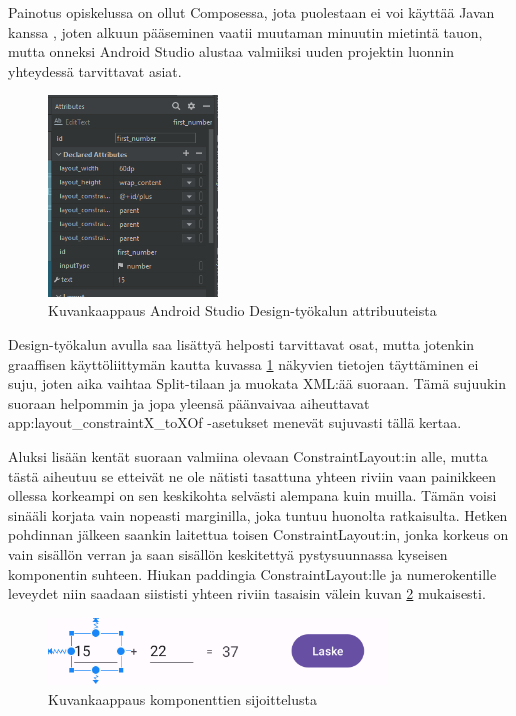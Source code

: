 Painotus opiskelussa on ollut Composessa, jota puolestaan ei voi käyttää Javan
kanssa \parencite{StackoverflowComposeInJava}, joten alkuun pääseminen vaatii
muutaman minuutin mietintä tauon, mutta onneksi Android Studio alustaa
valmiiksi uuden projektin luonnin yhteydessä tarvittavat asiat.

\begin{figure}
    \includegraphics[width=0.4\textwidth]{figures/exercise-4-attributes.png}
    \caption{Kuvankaappaus Android Studio Design-työkalun attribuuteista}
    \label{fig:exercise-4-attributes}
\end{figure}

Design-työkalun avulla saa lisättyä helposti tarvittavat osat, mutta jotenkin
graaffisen käyttöliittymän kautta kuvassa \ref{fig:exercise-4-attributes}
näkyvien tietojen täyttäminen ei suju, joten aika vaihtaa Split-tilaan ja
muokata XML:ää suoraan. Tämä sujuukin suoraan helpommin ja jopa yleensä
päänvaivaa aiheuttavat app:layout\_constraintX\_toXOf -asetukset menevät
sujuvasti tällä kertaa.

Aluksi lisään kentät suoraan valmiina olevaan ConstraintLayout:in alle, mutta
tästä aiheutuu se etteivät ne ole nätisti tasattuna yhteen riviin vaan
painikkeen ollessa korkeampi on sen keskikohta selvästi alempana kuin muilla.
Tämän voisi sinääli korjata vain nopeasti marginilla, joka tuntuu huonolta
ratkaisulta. Hetken pohdinnan jälkeen saankin laitettua toisen
ConstraintLayout:in, jonka korkeus on vain sisällön verran ja saan sisällön
keskitettyä pystysuunnassa kyseisen komponentin suhteen. Hiukan paddingia
ConstraintLayout:lle ja numerokentille leveydet niin saadaan siististi yhteen
riviin tasaisin välein kuvan \ref{fig:exercise-4-constraint-layout} mukaisesti.

\begin{figure}[h!]
    \centering
    \includegraphics[width=0.8\textwidth]{figures/exercise-4-constraint-layout.png}
    \caption{Kuvankaappaus komponenttien sijoittelusta}
    \label{fig:exercise-4-constraint-layout}
\end{figure}

